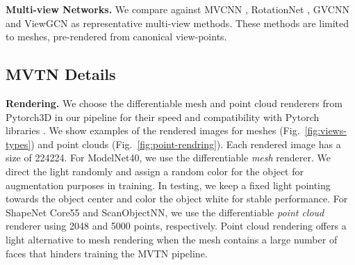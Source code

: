 \documentclass[10pt,twocolumn,letterpaper]{article}
\newcommand{\figLabel}{Fig.~}
\newcommand{\mysection}[1]{\noindent\textbf{#1.}}
\begin{document}
\mysection{Multi-view Networks}
We compare against MVCNN \cite{mvcnn}, RotationNet \cite{mvrotationnet}, GVCNN \cite{mvgvcnn} and ViewGCN \cite{mvviewgcn} as representative multi-view methods.
These methods are limited to meshes, pre-rendered from canonical view-points.
 \subsection{MVTN Details}
\vspace{-4pt}
\mysection{Rendering}
We choose the differentiable mesh and point cloud renderers  from Pytorch3D \cite{pytorch3d} in our pipeline for their speed and compatibility with Pytorch libraries \cite{paszke2017pytorch}. We show examples of the rendered images for meshes (\figLabel{\ref{fig:views-types}}) and point clouds (\figLabel{\ref{fig:point-rendring}}).
Each rendered image has a size of 224224. 
For ModelNet40, we use the differentiable \textit{mesh} renderer. We direct the light randomly and assign a random color for the object for augmentation purposes in training. In testing, we keep a fixed light pointing towards the object center and color the object white for stable performance. For ShapeNet Core55 and ScanObjectNN, we use the differentiable \textit{point cloud} renderer using 2048 and 5000 points, respectively. Point cloud rendering offers a light alternative to mesh rendering when the mesh contains a large number of faces that hinders training the MVTN pipeline.
\end{document}
